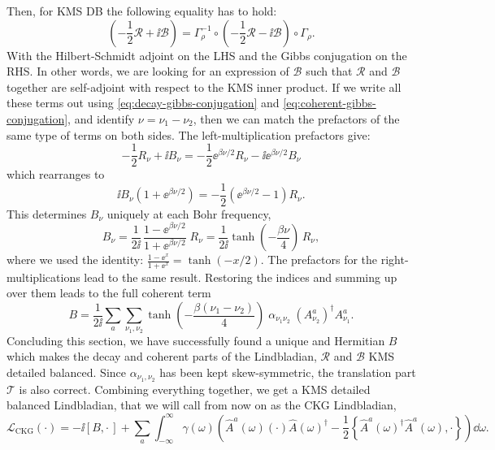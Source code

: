 Then, for KMS DB the following equality has to hold:
\begin{equation}
    \left(-\frac{1}{2}\mathcal{R} + \ii \mathcal{B}\right) = \Gamma_\rho^{-1}\circ\left(-\frac{1}{2}\mathcal{R} - \ii \mathcal{B}\right)\circ\Gamma_\rho.
\end{equation}
With the Hilbert-Schmidt adjoint on the LHS and the Gibbs conjugation on the RHS. In other words, we are looking for an expression of $\mathcal{B}$ such that $\mathcal{R}$ and $\mathcal{B}$ together are self-adjoint with respect to the KMS inner product. If we write all these terms out using \eqref{eq:decay-gibbs-conjugation} and \eqref{eq:coherent-gibbs-conjugation}, and identify $\nu = \nu_1 - \nu_2$, then we can match the prefactors of the same type of terms on both sides. The left-multiplication prefactors give: 
\begin{equation}
    -\frac{1}{2}R_{\nu} + \ii B_\nu = -\frac{1}{2} \ee^{\beta\nu / 2}R_{\nu} - \ii \ee^{\beta\nu / 2} B_\nu
\end{equation}
which rearranges to
\begin{equation}
    \ii B_\nu\left(1 + \ee^{\beta\nu / 2}\right) = -\frac{1}{2}\left(\ee^{\beta\nu / 2} - 1\right) R_{\nu}.
\end{equation}
This determines $B_\nu$ uniquely at each Bohr frequency,
\begin{equation}
    B_\nu = \frac{1}{2\ii}\,\frac{1 - \ee^{\beta\nu /2}}{1 + \ee^{\beta\nu /2}}\;R_\nu = \frac{1}{2\ii}\tanh\!\left(-\frac{\beta\nu}{4}\right)\,R_\nu,
\end{equation}
where we used the identity: $\frac{1 - \ee^x}{1 + \ee^x} = \tanh(-x / 2).$ The prefactors for the right-multiplications lead to the same result. Restoring the indices and summing up over them leads to the full coherent term
\begin{equation} \label{eq:B-bohr-domain}
    B = \frac{1}{2\ii}\sum_a\sum_{\nu_1,\nu_2}\tanh\!\left(-\frac{\beta(\nu_1-\nu_2)}{4}\right)\;\alpha_{\nu_1\nu_2}\;(A^a_{\nu_2})^\dagger A^a_{\nu_1}.
    \tag{ckg-b}
\end{equation}
Concluding this section, we have successfully found a unique and Hermitian $B$ which makes the decay and coherent parts of the Lindbladian, $\mathcal{R}$ and $\mathcal{B}$ KMS detailed balanced. Since $\alpha_{\nu_1, \nu_2}$ has been kept skew-symmetric, the translation part $\mathcal{T}$ is also correct. Combining everything together, we get a KMS detailed balanced Lindbladian, that we will call from now on as the CKG Lindbladian,
\begin{equation}\label{eq:ckg-L}
    \mathcal{L}_{\text{CKG}}(\cdot) = -\ii[B, \cdot\,] + \sum_a \int_{-\infty}^\infty \gamma(\omega) \left(\hat{A}^a(\omega)(\cdot)\hat{A}(\omega)^\dagger -\frac{1}{2}\left\{\hat{A}^a(\omega)^\dagger \hat{A}^a(\omega), \cdot \right\}\right)\dd\omega .
    \tag{ckg-l}
\end{equation}

